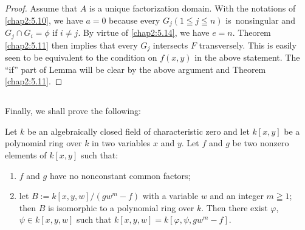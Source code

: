 \begin{proof}
Assume that $A$ is a unique factorization domain. With the notations
of \ref{chap2:5.10}, we have $a=0$ because every $G_{j}(1\leqq j\leqq n)$
is\pageoriginale\ nonsingular and $G_{j}\cap G_{i}=\phi$ if $i\neq
j$. By virtue of \ref{chap2:5.14}, we have $e=n$. Theorem \ref{chap2:5.11} then
implies that every $G_{j}$ intersects $F$ transversely. This is
easily seen to be equivalent to the condition on $f(x,y)$ in the above
statement. The ``if'' part of Lemma will be clear by the above
argument and Theorem \ref{chap2:5.11}.
\end{proof}

\subsection{}\label{chap2:5.25}
Finally, we shall prove the following:

\begin{theorem*}[\cf Russell \cite{49} and Sathaye \cite{52} in case
    $m=1$; \cf Wright \cite{56} in case $m>1$]
Let $k$ be an algebraically closed field of characteristic zero and
let $k[x,y]$ be a polynomial ring over $k$ in two variables $x$ and
$y$. Let $f$ and $g$ be two nonzero elements of $k[x,y]$ such that:
\begin{enumerate}
\renewcommand{\labelenumi}{\rm(\theenumi)}
\item $f$ and $g$ have no nonconstant common factors;

\item let $B:=k[x,y,w]/(gw^{m}-f)$ with a variable $w$ and an integer
  $m\geqq 1$; then $B$ is isomorphic to a polynomial ring over
  $k$. Then there exist $\varphi$, $\psi\in k[x,y,w]$ such that
  $k[x,y,w]=k[\varphi,\psi,gw^{m}-f]$. 
\end{enumerate}
\end{theorem*}

